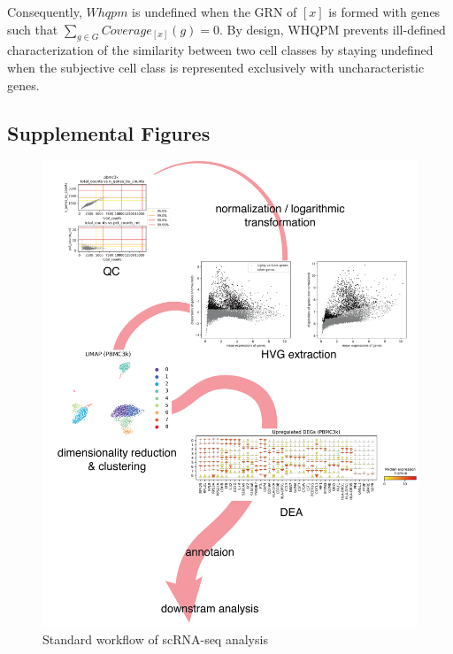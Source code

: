 \documentclass{article}
\begin{document}
Consequently, $Whqpm$ is undefined when the GRN of $[x]$ is formed with genes such that $\sum_{g\in G}Coverage_{[x]}(g)=0$. 
By design, WHQPM prevents ill-defined characterization of the similarity between two cell classes by staying 
undefined when the subjective cell class is represented exclusively with uncharacteristic genes.

\newpage
\subsection*{Supplemental Figures}
\begin{figure}[htb]
  \centering
  \includegraphics[scale=0.6]{./figs/exported/figure_s1.png}
  \caption{Standard workflow of scRNA-seq analysis}
  \label{fig_s1}
\end{figure}
\end{document}
